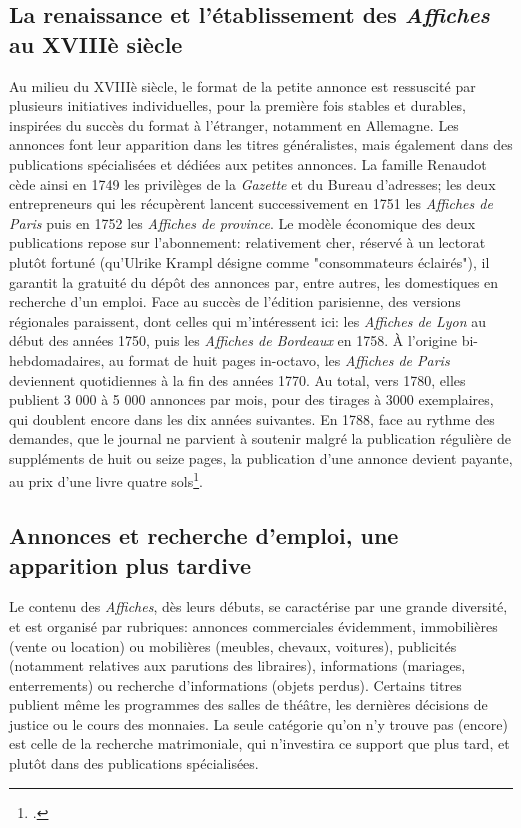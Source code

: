 \subsection{La renaissance et l'établissement des\textit{ Affiches} au XVIIIè siècle}

Au milieu du XVIIIè siècle, le format de la petite annonce est ressuscité par plusieurs initiatives individuelles, pour la première fois stables et durables, inspirées du succès du format à l'étranger, notamment en Allemagne. Les annonces font leur apparition dans les titres généralistes, mais également dans des publications spécialisées et dédiées aux petites annonces. La famille Renaudot cède ainsi en 1749 les privilèges de la \textit{Gazette} et du Bureau d'adresses; les deux entrepreneurs qui les récupèrent lancent successivement en 1751 les \textit{Affiches de Paris} puis en 1752 les \textit{Affiches de province}. Le modèle économique des deux publications repose sur l'abonnement: relativement cher, réservé à un lectorat plutôt fortuné (qu'Ulrike Krampl désigne comme "consommateurs éclairés"), il garantit la gratuité du dépôt des annonces par, entre autres, les domestiques en recherche d'un emploi. Face au succès de l'édition parisienne, des versions régionales paraissent, dont celles qui m'intéressent ici: les \textit{Affiches de Lyon} au début des années 1750, puis les \textit{Affiches de Bordeaux} en 1758.
À l'origine bi-hebdomadaires, au format de huit pages in-octavo, les \textit{Affiches de Paris} deviennent quotidiennes à la fin des années 1770. Au total, vers 1780, elles publient 3 000 à 5 000 annonces par mois, pour des tirages à 3000 exemplaires, qui doublent encore dans les dix années suivantes. En 1788, face au rythme des demandes, que le journal ne parvient à soutenir malgré la publication régulière de suppléments de huit ou seize pages, la publication d'une annonce devient payante, au prix d'une livre quatre sols\footcites{kramplPresseAnnoncesParisienne2020}. 

\subsection{Annonces et recherche d'emploi, une apparition plus tardive}


Le contenu des \textit{Affiches}, dès leurs débuts, se caractérise par une grande diversité, et est organisé par rubriques: annonces commerciales évidemment, immobilières (vente ou location) ou mobilières (meubles, chevaux, voitures), publicités (notamment relatives aux parutions des libraires), informations (mariages, enterrements) ou recherche d'informations (objets perdus). Certains titres publient même les programmes des salles de théâtre, les dernières décisions de justice ou le cours des monnaies. La seule catégorie qu'on n'y trouve pas (encore) est celle de la recherche matrimoniale, qui n'investira ce support que plus tard, et plutôt dans des publications spécialisées. 

